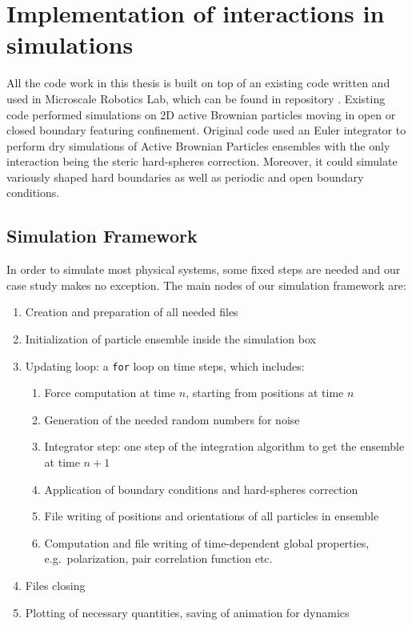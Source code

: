 \documentclass[../../master_thesis_np.tex]{subfiles}
\begin{document}
\chapter[Interaction Implementation]{Implementation of interactions in simulations}
\label{chap:int_impl}

	All the code work in this thesis is built on top of an existing code written and used in Microscale Robotics Lab, which can be found in repository \cite{sharma_simulations_2023}.
    Existing code performed simulations on 2D active Brownian particles moving in open or closed boundary featuring confinement. 
	Original code used an Euler integrator to perform dry simulations of Active Brownian Particles ensembles with the only interaction being the steric hard-spheres correction. 
	Moreover, it could simulate variously shaped hard boundaries as well as periodic and open boundary conditions.
	
	\section{Simulation Framework}
	In order to simulate most physical systems, some fixed steps are needed and our case study makes no exception. 
	The main nodes of our simulation framework are:
	\begin{enumerate}
		\item Creation and preparation of all needed files
		\item Initialization of particle ensemble inside the simulation box
		\item Updating loop: a \verb|for| loop on time steps, which includes:
		\begin{enumerate}
			\item Force computation at time $n$, starting from positions at time $n$
			\item Generation of the needed random numbers for noise
			\item Integrator step: one step of the integration algorithm to get the ensemble at time $n+1$
			\item Application of boundary conditions and hard-spheres correction 
			\item File writing of positions and orientations of all particles in ensemble %
			\item Computation and file writing of time-dependent global properties, e.g.\ polarization, pair correlation function etc.	%
		\end{enumerate}
		\item Files closing
		\item Plotting of necessary quantities, saving of animation for dynamics
	\end{enumerate}
	
\end{document}
